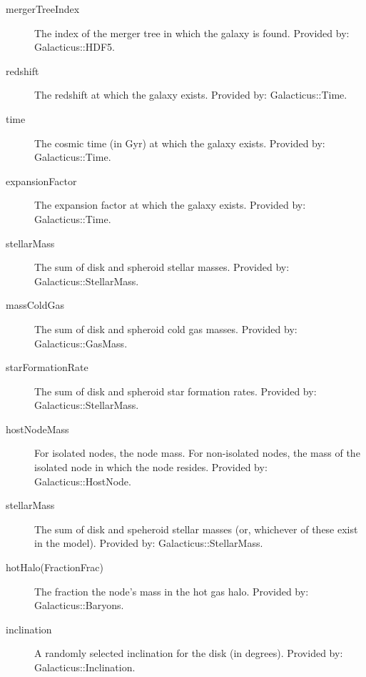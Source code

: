 \begin{description}
 \item[{\normalfont \ttfamily mergerTreeIndex}] The index of the merger tree in which the galaxy is found. Provided by: {\normalfont \ttfamily Galacticus::HDF5}.
 \item[{\normalfont \ttfamily redshift}] The redshift at which the galaxy exists. Provided by: {\normalfont \ttfamily Galacticus::Time}.
 \item[{\normalfont \ttfamily time}] The cosmic time (in Gyr) at which the galaxy exists. Provided by: {\normalfont \ttfamily Galacticus::Time}.
 \item[{\normalfont \ttfamily expansionFactor}] The expansion factor at which the galaxy exists. Provided by: {\normalfont \ttfamily Galacticus::Time}.
 \item[{\normalfont \ttfamily stellarMass}] The sum of disk and spheroid stellar masses. Provided by: {\normalfont \ttfamily Galacticus::StellarMass}.
 \item[{\normalfont \ttfamily massColdGas}] The sum of disk and spheroid cold gas masses. Provided by: {\normalfont \ttfamily Galacticus::GasMass}.
 \item[{\normalfont \ttfamily starFormationRate}] The sum of disk and spheroid star formation rates. Provided by: {\normalfont \ttfamily Galacticus::StellarMass}.
 \item[{\normalfont \ttfamily hostNodeMass}] For isolated nodes, the node mass. For non-isolated nodes, the mass of the isolated node in which the node resides. Provided by: {\normalfont \ttfamily Galacticus::HostNode}.
 \item[{\normalfont \ttfamily stellarMass}] The sum of disk and speheroid stellar masses (or, whichever of these exist in the model). Provided by: {\normalfont \ttfamily Galacticus::StellarMass}.
 \item[{\normalfont \ttfamily hotHalo(Fraction\textbar Frac)}] The fraction the node's mass in the hot gas halo. Provided by: {\normalfont \ttfamily Galacticus::Baryons}.
 \item[{\normalfont \ttfamily inclination}] A randomly selected inclination for the disk (in degrees). Provided by: {\normalfont \ttfamily Galacticus::Inclination}.

\end{description}
